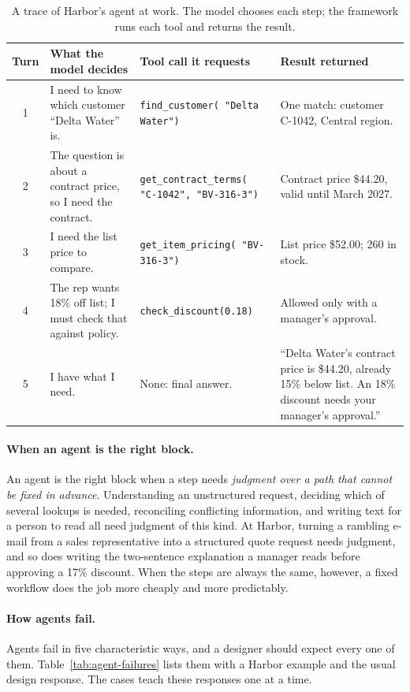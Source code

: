 \begin{table}[htbp]
\centering
\small
\caption{A trace of Harbor's agent at work. The model chooses each step; the framework runs each tool and returns the result.}
\label{tab:agent-trace}
\begin{tabularx}{\textwidth}{@{}c>{\raggedright\arraybackslash}X>{\raggedright\arraybackslash}p{3.6cm}>{\raggedright\arraybackslash}X@{}}
\toprule
Turn & What the model decides & Tool call it requests & Result returned \\
\midrule
1 & I need to know which customer ``Delta Water'' is. & \texttt{find\_customer( "Delta Water")} & One match: customer C-1042, Central region. \\
2 & The question is about a contract price, so I need the contract. & \texttt{get\_contract\_terms( "C-1042", "BV-316-3")} & Contract price \$44.20, valid until March 2027. \\
3 & I need the list price to compare. & \texttt{get\_item\_pricing( "BV-316-3")} & List price \$52.00; 260 in stock. \\
4 & The rep wants 18\% off list; I must check that against policy. & \texttt{check\_discount(0.18)} & Allowed only with a manager's approval. \\
5 & I have what I need. & None: final answer. & ``Delta Water's contract price is \$44.20, already 15\% below list. An 18\% discount needs your manager's approval.'' \\
\bottomrule
\end{tabularx}
\end{table}

\paragraph{When an agent is the right block.} An agent is the right block when a step needs \emph{judgment over a path that cannot be fixed in advance}. Understanding an unstructured request, deciding which of several lookups is needed, reconciling conflicting information, and writing text for a person to read all need judgment of this kind. At Harbor, turning a rambling e-mail from a sales representative into a structured quote request needs judgment, and so does writing the two-sentence explanation a manager reads before approving a 17\% discount. When the steps are always the same, however, a fixed workflow does the job more cheaply and more predictably.

\paragraph{How agents fail.} Agents fail in five characteristic ways, and a designer should expect every one of them. Table~\ref{tab:agent-failures} lists them with a Harbor example and the usual design response. The cases teach these responses one at a time.

